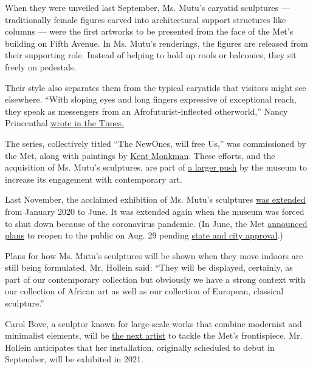 When they were unveiled last September, Ms. Mutu's caryatid sculptures
--- traditionally female figures carved into architectural support
structures like columns --- were the first artworks to be presented from
the face of the Met's building on Fifth Avenue. In Ms. Mutu's
renderings, the figures are released from their supporting role. Instead
of helping to hold up roofs or balconies, they sit freely on pedestals.

Their style also separates them from the typical caryatids that visitors
might see elsewhere. ``With sloping eyes and long fingers expressive of
exceptional reach, they speak as messengers from an
Afrofuturist-inflected otherworld,'' Nancy Princenthal
\href{https://www.nytimes3xbfgragh.onion/2019/09/05/arts/design/wangechi-mutu-metropolitan-museum.html}{wrote
in the Times.}

The series, collectively titled ``The NewOnes, will free Us,'' was
commissioned by the Met, along with paintings by
\href{https://www.youtube.com/watch?v=qvofmOMDLMM}{Kent Monkman}. These
efforts, and the acquisition of Ms. Mutu's sculptures, are part of
\href{https://www.nytimes3xbfgragh.onion/2019/03/21/arts/design/the-met-will-use-its-facade-and-great-hall-to-showcase-contemporary-art.html}{a
larger push} by the museum to increase its engagement with contemporary
art.

Last November, the acclaimed exhibition of Ms. Mutu's sculptures
\href{https://www.nytimes3xbfgragh.onion/2019/11/06/arts/design/Wangechi-Mutu-metropolitan-museum-extension.html}{was
extended} from January 2020 to June. It was extended again when the
museum was forced to shut down because of the coronavirus pandemic. (In
June, the Met
\href{https://www.nytimes3xbfgragh.onion/2020/06/23/arts/design/met-museum-reopen-virus.html}{announced
plans} to reopen to the public on Aug. 29 pending
\href{https://www.nytimes3xbfgragh.onion/2020/07/17/arts/design/nyc-museums-phase-4.html}{state
and city approval}.)

Plans for how Ms. Mutu's sculptures will be shown when they move indoors
are still being formulated, Mr. Hollein said: ``They will be displayed,
certainly, as part of our contemporary collection but obviously we have
a strong context with our collection of African art as well as our
collection of European, classical sculpture.''

Carol Bove, a sculptor known for large-scale works that combine
modernist and minimalist elements, will be
\href{https://www.nytimes3xbfgragh.onion/2020/02/20/arts/design/met-museum-rooftop-commission.html}{the
next artist} to tackle the Met's frontispiece. Mr. Hollein anticipates
that her installation, originally scheduled to debut in September, will
be exhibited in 2021.

